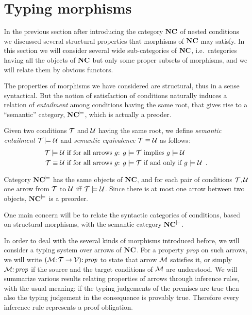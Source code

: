 \section{Typing morphisms}
\label{sec:typing morphisms}


In the previous section after introducing the category $\mathbf{NC}$ of nested conditions we discussed several structural properties that morphisms of $\mathbf{NC}$ may satisfy. In this section we will consider several wide sub-categories of $\mathbf{NC}$, i.e.~categories having all the objects of $\mathbf{NC}$ but only some proper subsets of morphisms, and we will relate them by obvious functors. 

The properties of morphisms we have considered are structural, thus in a sense syntactical. But the notion of satisfaction of conditions naturally induces a relation of \emph{entailment} among conditions having the same root, that gives rise to a ``semantic'' category, $\mathbf{NC}^{\models}$, which is actually a preoder. 

\begin{definition}
Given two conditions ${\mathcal{T}}$ and ${\mathcal{U}}$ having the same root,  we define \emph{semantic entailment} ${\mathcal{T}} \models {\mathcal{U}}$ and \emph{semantic equivalence} ${\mathcal{T}} \equiv {\mathcal{U}}$ as follows:
\begin{align*}
{\mathcal{T}} \models {\mathcal{U}} & \text{ if for all arrows $g$: } g\models {\mathcal{T}} \text{ implies } g\models {\mathcal{U}} \\
{\mathcal{T}} \equiv {\mathcal{U}} & \text{ if for all arrows $g$: } g\models {\mathcal{T}} \text{ if and only if } g\models {\mathcal{U}} \enspace. 
\end{align*}

Category $\mathbf{NC}^{\models}$ has the same objects of $\mathbf{NC}$, and for each pair of conditions ${\mathcal{T}},{\mathcal{U}}$ one arrow from ${\mathcal{T}}$ to ${\mathcal{U}}$ iff ${\mathcal{T}} \models {\mathcal{U}}$. Since there is at most one arrow between two objects, $\mathbf{NC}^{\models}$ is a preorder.
\end{definition}

One main concern will be to relate the syntactic categories of conditions, based on structural morphisms, with the semantic category $\mathbf{NC}^{\models}$. 

In order to deal with the several kinds of morphisms introduced before, we will consider a typing system over arrows of $\mathbf{NC}$. For a property \emph{prop} on such arrows, we will write $({\mathcal{M}} {:}\, {\mathcal{T}} \rightarrow {\mathcal{V}}) {:}\, \mathit{prop}$ to state that arrow ${\mathcal{M}}$ satisfies it, or simply ${\mathcal{M}} {:}\, \mathit{prop}$ if the source and the target conditions of ${\mathcal{M}}$ are understood. We will summarize various results relating properties of arrows through inference rules, with the usual meaning: if the typing judgements of the premises are true then also the typing judgement in the consequence is provably true. Therefore every inference rule represents a proof obligation.

